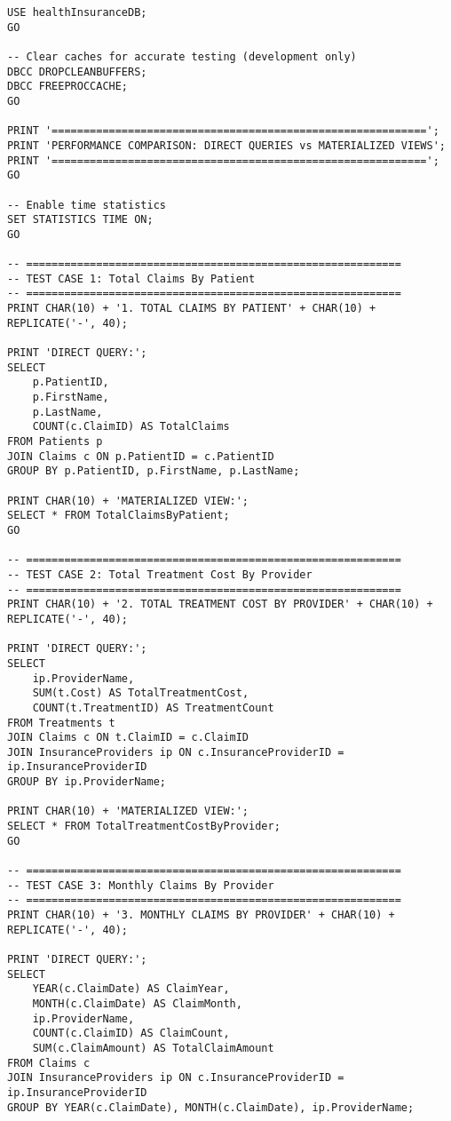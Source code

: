 \begin{lstlisting}[style=sqlstyle, caption={Materialized view creation}, label=lst:Analysis]
USE healthInsuranceDB;
GO

-- Clear caches for accurate testing (development only)
DBCC DROPCLEANBUFFERS;
DBCC FREEPROCCACHE;
GO

PRINT '===========================================================';
PRINT 'PERFORMANCE COMPARISON: DIRECT QUERIES vs MATERIALIZED VIEWS';
PRINT '===========================================================';
GO

-- Enable time statistics
SET STATISTICS TIME ON;
GO

-- ===========================================================
-- TEST CASE 1: Total Claims By Patient
-- ===========================================================
PRINT CHAR(10) + '1. TOTAL CLAIMS BY PATIENT' + CHAR(10) + REPLICATE('-', 40);

PRINT 'DIRECT QUERY:';
SELECT 
    p.PatientID,
    p.FirstName,
    p.LastName,
    COUNT(c.ClaimID) AS TotalClaims
FROM Patients p
JOIN Claims c ON p.PatientID = c.PatientID
GROUP BY p.PatientID, p.FirstName, p.LastName;

PRINT CHAR(10) + 'MATERIALIZED VIEW:';
SELECT * FROM TotalClaimsByPatient;
GO

-- ===========================================================
-- TEST CASE 2: Total Treatment Cost By Provider
-- ===========================================================
PRINT CHAR(10) + '2. TOTAL TREATMENT COST BY PROVIDER' + CHAR(10) + REPLICATE('-', 40);

PRINT 'DIRECT QUERY:';
SELECT 
    ip.ProviderName,
    SUM(t.Cost) AS TotalTreatmentCost,
    COUNT(t.TreatmentID) AS TreatmentCount
FROM Treatments t
JOIN Claims c ON t.ClaimID = c.ClaimID
JOIN InsuranceProviders ip ON c.InsuranceProviderID = ip.InsuranceProviderID
GROUP BY ip.ProviderName;

PRINT CHAR(10) + 'MATERIALIZED VIEW:';
SELECT * FROM TotalTreatmentCostByProvider;
GO

-- ===========================================================
-- TEST CASE 3: Monthly Claims By Provider
-- ===========================================================
PRINT CHAR(10) + '3. MONTHLY CLAIMS BY PROVIDER' + CHAR(10) + REPLICATE('-', 40);

PRINT 'DIRECT QUERY:';
SELECT 
    YEAR(c.ClaimDate) AS ClaimYear,
    MONTH(c.ClaimDate) AS ClaimMonth,
    ip.ProviderName,
    COUNT(c.ClaimID) AS ClaimCount,
    SUM(c.ClaimAmount) AS TotalClaimAmount
FROM Claims c
JOIN InsuranceProviders ip ON c.InsuranceProviderID = ip.InsuranceProviderID
GROUP BY YEAR(c.ClaimDate), MONTH(c.ClaimDate), ip.ProviderName;


\end{lstlisting}
